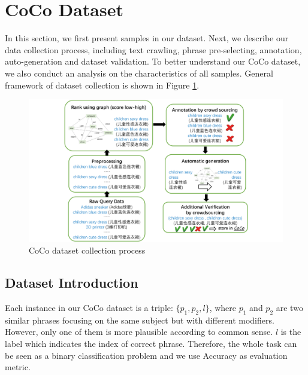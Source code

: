 \section{CoCo Dataset}
In this section, we first present samples in our dataset. Next, we describe our data collection process, including text crawling, phrase pre-selecting, annotation, auto-generation and dataset validation. To better understand our CoCo dataset, we also conduct an analysis on the characteristics of all samples. General framework of dataset collection is shown in Figure \ref{fig:framework}.

\begin{figure}
	\centering
	\includegraphics[width=\columnwidth]{images/framework.pdf}
	\caption{CoCo dataset collection process}
	\label{fig:framework}
\end{figure}

\subsection{Dataset Introduction}
Each instance in our CoCo dataset is %
a triple: $\{p_1, p_2, l\}$,
where $p_1$ and $p_2$ are two similar phrases focusing on the same subject
but with different modifiers.
However, only one of them is more plausible according to common sense. 
$l$ is the label which indicates the index of correct phrase. 
Therefore, the whole task can be seen as a binary classification problem 
and we use Accuracy as evaluation metric. 

